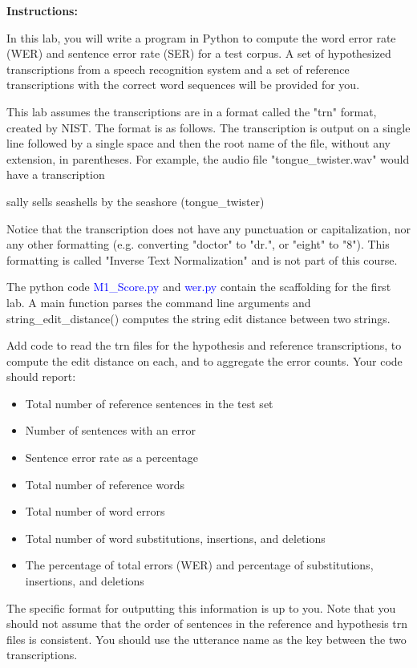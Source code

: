 {\bf Instructions:}

In this lab, you will write a program in Python to compute the word error rate (WER) and sentence error rate (SER) for a test corpus. A set of hypothesized transcriptions from a speech recognition system and a set of reference transcriptions with the correct word sequences will be provided for you.

This lab assumes the transcriptions are in a format called the "trn" format, created by NIST. The format is as follows. The transcription is output on a single line followed by a single space and then the root name of the file, without any extension, in parentheses. For example, the audio file "tongue\_twister.wav" would have a transcription

sally sells seashells by the seashore (tongue\_twister)

Notice that the transcription does not have any punctuation or capitalization, nor any other formatting (e.g. converting "doctor" to "dr.", or "eight" to "8"). This formatting is called "Inverse Text Normalization" and is not part of this course.

The python code \textcolor{blue}{M1\_Score.py} and \textcolor{blue}{wer.py} contain the scaffolding for the first lab. A main function parses the command line arguments and string\_edit\_distance() computes the string edit distance between two strings.

Add code to read the trn files for the hypothesis and reference transcriptions, to compute the edit distance on each, and to aggregate the error counts. Your code should report:
\begin{itemize}
	\item Total number of reference sentences in the test set
	\item Number of sentences with an error
	\item Sentence error rate as a percentage
	\item Total number of reference words
	\item Total number of word errors
	\item Total number of word substitutions, insertions, and deletions
	\item The percentage of total errors (WER) and percentage of substitutions, insertions, and deletions
\end{itemize}

The specific format for outputting this information is up to you. Note that you should not assume that the order of sentences in the reference and hypothesis trn files is consistent. You should use the utterance name as the key between the two transcriptions.

